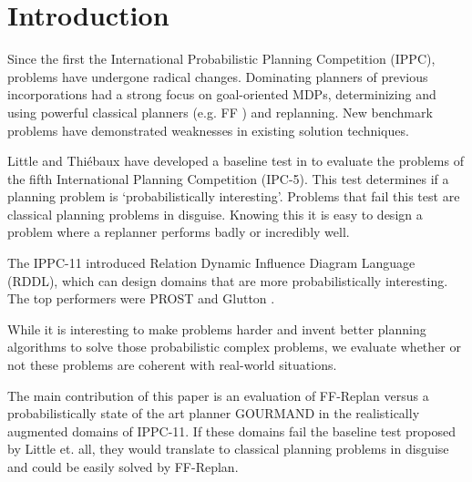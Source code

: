\documentclass[runningheads,a4paper]{llncs}
\begin{document}

\section{Introduction}

Since the first the International Probabilistic Planning Competition (IPPC),
problems have undergone radical changes. Dominating planners of previous
incorporations had a strong focus on goal-oriented MDPs, determinizing and
using powerful classical planners (e.g. FF \cite{Hoffmann01theff}) and
replanning. New benchmark problems have demonstrated weaknesses in existing
solution techniques.

Little and Thi\'ebaux have developed a baseline test in
\cite{little2007probvsreplan} to evaluate the problems of the fifth International
Planning Competition (IPC-5). This test determines if a planning problem is
`probabilistically interesting'. Problems that fail this test are classical
planning problems in disguise. Knowing this it is easy to design a problem
where a replanner performs badly or incredibly well.

The IPPC-11 introduced Relation Dynamic Influence Diagram Language (RDDL),
which can design domains that are more probabilistically interesting. The top
performers were PROST \cite{keller2012prost} and Glutton
\cite{kolobov2012glutton}.

While it is interesting to make problems harder and invent better planning
algorithms to solve those probabilistic complex problems, we evaluate whether
or not these problems are coherent with real-world situations.

The main contribution of this paper is an evaluation of FF-Replan versus a
probabilistically state of the art planner GOURMAND in the realistically
augmented domains of IPPC-11. If these domains fail the baseline test proposed
by Little et\@. all, they would translate to classical planning problems in
disguise and could be easily solved by FF-Replan.

\end{document}
